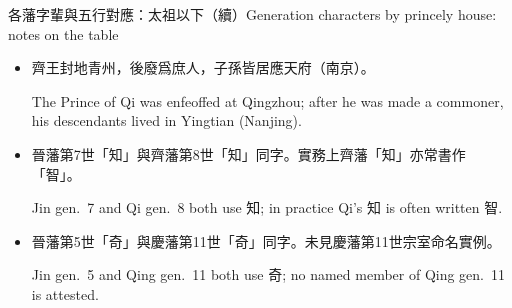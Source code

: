 \documentclass[aspectratio=169,12pt,t]{beamer}
\newcommand{\en}[1]{\par{\parskip=0pt\scriptsize\color{black!60}#1\par}}
\begin{document}
\begin{frame}{各藩字輩與五行對應：太祖以下（續）}{Generation characters by princely house: notes on the table}
  \begin{itemize}
    \item 齊王封地青州，後廢爲庶人，子孫皆居應天府（南京）。
      \en{The Prince of Qi was enfeoffed at Qingzhou; after he was made a commoner, his descendants lived in Yingtian (Nanjing).}
    \item 晉藩第7世「知」與齊藩第8世「知」同字。實務上齊藩「知」亦常書作「智」。
      \en{Jin gen.~7 and Qi gen.~8 both use 知; in practice Qi's 知 is often written 智.}
    \item 晉藩第5世「奇」與慶藩第11世「奇」同字。未見慶藩第11世宗室命名實例。
      \en{Jin gen.~5 and Qing gen.~11 both use 奇; no named member of Qing gen.~11 is attested.}
  \end{itemize}
\end{frame}
\end{document}
